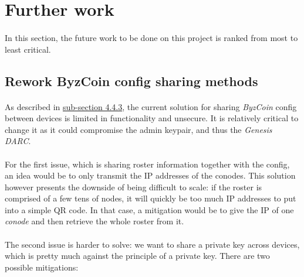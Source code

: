\section{Further work}

\paragraph{}

In this section, the future work to be done on this project is ranked from most to least critical.

\subsection{Rework ByzCoin config sharing methods}

\paragraph{}

As described in \hyperref[subsection443]{sub-section 4.4.3}, the current solution for sharing \textit{ByzCoin} config between devices is limited in functionality and unsecure. It is relatively critical to change it as it could compromise the admin keypair, and thus the \textit{Genesis DARC}.

\paragraph{}

For the first issue, which is sharing roster information together with the config, an idea would be to only transmit the IP addresses of the conodes. This solution however presents the downside of being difficult to scale: if the roster is comprised of a few tens of nodes, it will quickly be too much IP addresses to put into a simple QR code. In that case, a mitigation would be to give the IP of one \textit{conode} and then retrieve the whole roster from it.

\paragraph{}

The second issue is harder to solve: we want to share a private key across devices, which is pretty much against the principle of a private key. There are two possible mitigations:

